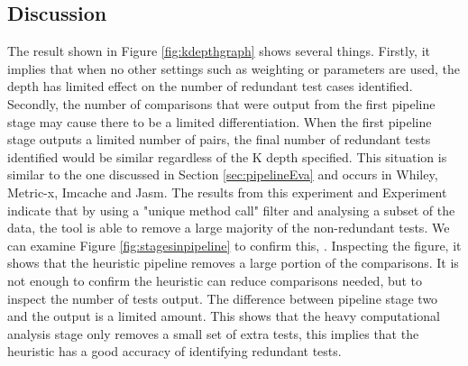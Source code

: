 \subsection{Discussion} 
The result shown in Figure \ref{fig:kdepthgraph} shows several things. Firstly, it implies that when no other settings such as weighting or parameters are used, the depth has limited effect on the number of redundant test cases identified. Secondly, the number of comparisons that were output from the first pipeline stage may cause there to be a limited differentiation. When the first pipeline stage outputs a limited number of pairs, the final number of redundant tests identified would be similar regardless of the K depth specified. This situation is similar to the one discussed in Section \ref{sec:pipelineEva} and occurs in Whiley, Metric-x, Imcache and Jasm. The results from this experiment and Experiment  indicate that by using a "unique method call" filter and analysing a subset of the data, the tool is able to remove a large majority of the non-redundant tests. We can examine Figure \ref{fig:stagesinpipeline} to confirm this,  . Inspecting the figure, it shows that the heuristic pipeline removes a large portion of the comparisons. It is not enough to confirm the heuristic can reduce comparisons needed, but to inspect the number of tests output. The difference between pipeline stage two and the output is a limited amount. This shows that the heavy computational analysis stage only removes a small set of extra tests, this implies that the heuristic has a good accuracy of identifying redundant tests.
